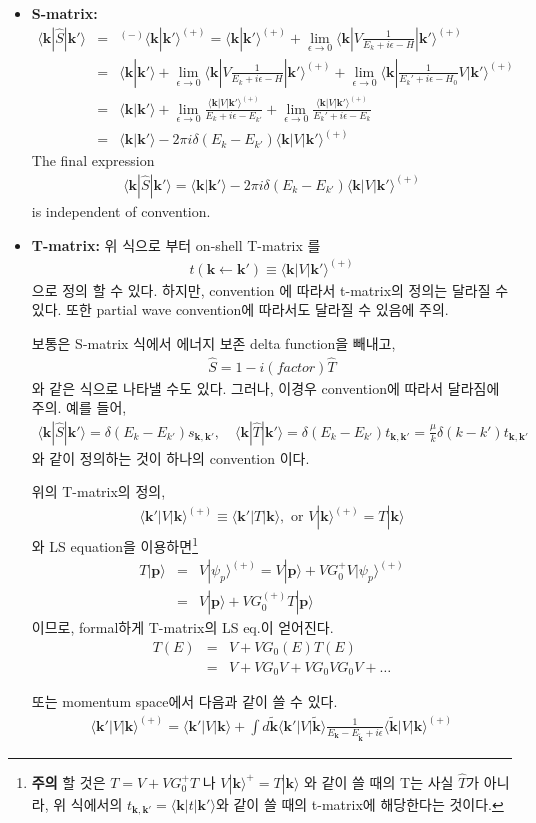\documentclass[10pt]{article}
\def\bm{\boldsymbol}
\newcommand{\bea}{\begin{eqnarray}}
\newcommand{\eea}{\end{eqnarray}}
\newcommand{\no}{\nonumber \\}
\def\vp{{\bm p}}
\def\vk{{\bm k}}
\def\la{\langle}
\def\ra{\rangle}
\begin{document}
\begin{itemize}
\item {\bf S-matrix:}  
\bea
\la \vk|\hat{S}|\vk'\ra
&=&{}^{(-)}\la\vk|\vk'\ra^{(+)}
=\la \vk|\vk'\ra^{(+)}
 +\lim_{\epsilon\to 0} \la \vk|V \frac{1}{E_k+ i\epsilon-H}|\vk'\ra^{(+)}\no
&=&\la \vk|\vk'\ra
 +\lim_{\epsilon\to 0} \la \vk|V \frac{1}{E_k+ i\epsilon-H}|\vk'\ra^{(+)}
 +\lim_{\epsilon\to 0} \la \vk|\frac{1}{E_k'+ i\epsilon-H_0}V|\vk'\ra^{(+)}\no
&=&\la \vk|\vk'\ra
 +\lim_{\epsilon\to 0}\frac{\la \vk|V |\vk'\ra^{(+)}}
                           {E_k+ i\epsilon-E_{k'}} 
 +\lim_{\epsilon\to 0}\frac{\la \vk|V|\vk'\ra^{(+)}}
                           {E_k'+ i\epsilon-E_k}   
\no
&=&\la \vk|\vk'\ra-2\pi i\delta(E_k-E_{k'})\la \vk|V|\vk'\ra^{(+)}
\eea
The final expression
\bea
\boxed{
\la \vk|\hat{S}|\vk'\ra=\la \vk|\vk'\ra-2\pi i\delta(E_k-E_{k'})\la \vk|V|\vk'\ra^{(+)}
}
\eea
is independent of convention. 

\item {\bf T-matrix:} 위 식으로 부터 on-shell T-matrix 를 
\bea
t(\vk\leftarrow\vk')\equiv \la \vk|V|\vk'\ra^{(+)}
\eea
으로 정의 할 수 있다. 하지만, convention 에 따라서
t-matrix의 정의는 달라질 수 있다. 또한 partial wave convention에 따라서도 달라질 수 있음에 주의.

보통은 S-matrix 식에서 에너지 보존 delta function을 빼내고,
\bea
\hat{S}=1-i(factor)\hat{T}
\eea
와 같은 식으로 나타낼 수도 있다. 
그러나, 이경우 convention에 따라서 
달라짐에 주의. 
예를 들어, 
\bea
\la\vk|\hat{S}|\vk'\ra=\delta(E_k-E_{k'})s_{\vk,\vk'},
\quad
\la\vk|\hat{T}|\vk'\ra=\delta(E_k-E_{k'})t_{\vk,\vk'}
                 =\frac{\mu}{k}\delta(k-k')t_{\vk,\vk'}
\eea
와 같이 정의하는 것이 하나의 convention 이다.

위의 T-matrix의 정의, 
\bea
\boxed{
\la \vk'|V|\vk\ra^{(+)} \equiv \la \vk'|T|\vk\ra,\mbox{ or } 
   V|\vk\ra^{(+)}= T|\vk\ra}
\eea
와 LS equation을 이용하면\footnote{
{\bf 주의} 할 것은 $T=V+VG^{+}_0T$ 나 $V|\vk\ra^{+}=T|\vk\ra$
와 같이 쓸 때의 T는 사실 $\hat{T}$가 아니라, 
위 식에서의 $t_{\vk,\vk'}=\la \vk|t|\vk'\ra$와 같이 쓸 때의
t-matrix에 해당한다는 것이다.
}
\bea
T|\vp\ra&=&V|\psi_p\ra^{(+)}=V|\vp\ra+VG_0^+ V|\psi_p\ra^{(+)}\no
              &=&V|\vp\ra+V G_0^{(+)} T|\vp\ra
\eea 
이므로, formal하게 T-matrix의 LS eq.이 얻어진다. 
\bea
T(E)&=&V+VG_0(E) T(E) \no 
 &=&V+VG_0V+VG_0VG_0V+\dots 
\eea

또는 momentum space에서 다음과 같이 쓸 수 있다.
\bea
\boxed{
\la\vk'|V|\vk\ra^{(+)}
=\la \vk'|V|\vk\ra
+\int d\tilde{\vk}
\la \vk'|V|\tilde{\vk}\ra
\frac{1}{E_\vk-E_{\tilde{\vk}}+i\epsilon}
\la\tilde{\vk}|V|\vk\ra^{(+)} 
}
\eea


\end{itemize}
\end{document}
